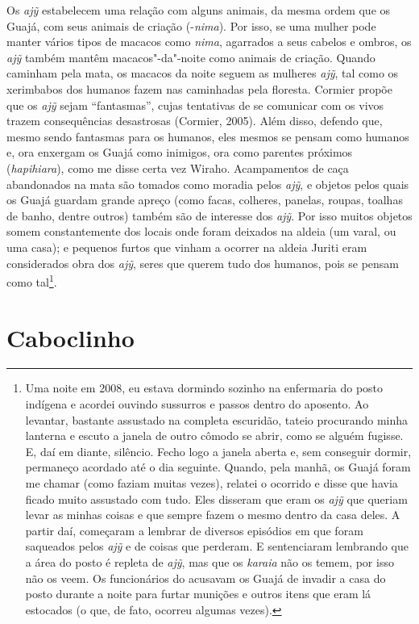 Os \emph{ajỹ} estabelecem uma relação com alguns animais, da mesma ordem
que os Guajá, com seus animais de criação (-\emph{nima}). Por isso, se
uma mulher pode manter vários tipos de macacos como \emph{nima},
agarrados a seus cabelos e ombros, os \emph{ajỹ} também mantêm
macacos"-da"-noite como animais de criação. Quando caminham pela mata, os
macacos da noite seguem as mulheres \emph{ajỹ}, tal como os xerimbabos
dos humanos fazem nas caminhadas pela floresta. Cormier propõe que os
\emph{ajỹ} sejam ``fantasmas'', cujas tentativas de se comunicar com os
vivos trazem consequências desastrosas (Cormier, 2005). Além disso,
defendo que, mesmo sendo fantasmas para os humanos, eles mesmos se
pensam como humanos e, ora enxergam os Guajá como inimigos, ora como
parentes próximos (\emph{hapihiara}), como me disse certa vez Wiraho.
Acampamentos de caça abandonados na mata são tomados como moradia pelos
\emph{ajỹ}, e objetos pelos quais os Guajá guardam grande apreço (como
facas, colheres, panelas, roupas, toalhas de banho, dentre outros)
também são de interesse dos \emph{ajỹ}. Por isso muitos objetos somem
constantemente dos locais onde foram deixados na aldeia (um varal, ou
uma casa); e pequenos furtos que vinham a ocorrer na aldeia Juriti eram
considerados obra dos \emph{ajỹ}, seres que querem tudo dos humanos,
pois se pensam como tal\footnote{Uma noite em 2008, eu estava dormindo
  sozinho na enfermaria do posto indígena e acordei ouvindo sussurros e
  passos dentro do aposento. Ao levantar, bastante assustado na completa
  escuridão, tateio procurando minha lanterna e escuto a janela de outro
  cômodo se abrir, como se alguém fugisse. E, daí em diante, silêncio.
  Fecho logo a janela aberta e, sem conseguir dormir, permaneço acordado
  até o dia seguinte. Quando, pela manhã, os Guajá foram me chamar (como
  faziam muitas vezes), relatei o ocorrido e disse que havia ficado
  muito assustado com tudo. Eles disseram que eram os \emph{ajỹ} que
  queriam levar as minhas coisas e que sempre fazem o mesmo dentro da
  casa deles. A partir daí, começaram a lembrar de diversos episódios em
  que foram saqueados pelos \emph{ajỹ} e de coisas que perderam. E
  sentenciaram lembrando que a área do posto é repleta de \emph{ajỹ},
  mas que os \emph{karaia} não os temem, por isso não os veem. Os
  funcionários do  acusavam os Guajá de invadir a casa do posto
  durante a noite para furtar munições e outros itens que eram lá
  estocados (o que, de fato, ocorreu algumas vezes).}.

\section{Caboclinho}

